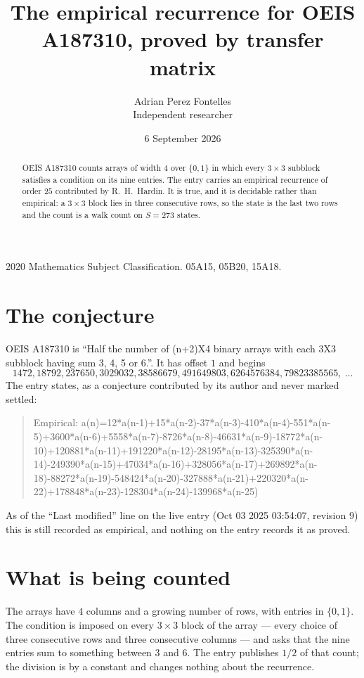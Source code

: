 \documentclass[11pt,a4paper]{article}
\title{The empirical recurrence for OEIS A187310, proved by transfer matrix}
\author{Adrian Perez Fontelles\\ \small Independent researcher}
\date{6 September 2026}
\theoremstyle{plain}
\theoremstyle{definition}
\begin{document}
\maketitle

\begin{abstract}
OEIS A187310 counts arrays of width $4$ over $\{0,1\}$ in which every $3\times3$ subblock
satisfies a condition on its nine entries. The entry carries an empirical recurrence of order
$25$ contributed by R.~H.~Hardin. It is true, and it is decidable rather than empirical: a
$3\times3$ block lies in three consecutive rows, so the state is the last two rows and the
count is a walk count on $S=273$ states.
\end{abstract}

\noindent\small 2020 Mathematics Subject Classification. 05A15, 05B20, 15A18.\normalsize

\section{The conjecture}

OEIS A187310 is ``Half the number of (n+2)X4 binary arrays with each 3X3 subblock having sum 3, 4, 5 or 6.''. It has offset $1$ and begins
\[
1472, 18792, 237650, 3029032, 38586679, 491649803, 6264576384, 79823385565,\ \dots
\]
The entry states, as a conjecture contributed by its author and never marked settled:
\begin{quote}
Empirical: a(n)=12*a(n-1)+15*a(n-2)-37*a(n-3)-410*a(n-4)-551*a(n-5)+3600*a(n-6)+5558*a(n-7)-8726*a(n-8)-46631*a(n-9)-18772*a(n-10)+120881*a(n-11)+191220*a(n-12)-28195*a(n-13)-325390*a(n-14)-249390*a(n-15)+47034*a(n-16)+328056*a(n-17)+269892*a(n-18)-88272*a(n-19)-548424*a(n-20)-327888*a(n-21)+220320*a(n-22)+178848*a(n-23)-128304*a(n-24)-139968*a(n-25)
\end{quote}
As of the ``Last modified'' line on the live entry (Oct 03 2025 03:54:07, revision 9) this is still
recorded as empirical, and nothing on the entry records it as proved.

\section{What is being counted}

The arrays have $4$ columns and a growing number of rows, with entries in $\{0,1\}$. The
condition is imposed on every $3\times3$ block of the array --- every choice of three
consecutive rows and three consecutive columns --- and asks that the nine entries sum to something between $3$ and $6$. The entry publishes $1/2$ of that count; the division is by a constant and changes nothing about the recurrence.
\end{document}

